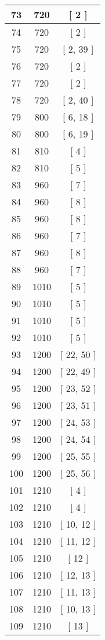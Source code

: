 \begin{center}
\begin{longtable}[H]{|| c c c ||}
73 & 720 & [ 2 ] \\ 
\hline
74 & 720 & [ 2 ] \\ 
\hline
75 & 720 & [ 2, 39 ] \\ 
\hline
76 & 720 & [ 2 ] \\ 
\hline
77 & 720 & [ 2 ] \\ 
\hline
78 & 720 & [ 2, 40 ] \\ 
\hline
79 & 800 & [ 6, 18 ] \\ 
\hline
80 & 800 & [ 6, 19 ] \\ 
\hline
81 & 810 & [ 4 ] \\ 
\hline
82 & 810 & [ 5 ] \\ 
\hline
83 & 960 & [ 7 ] \\ 
\hline
84 & 960 & [ 8 ] \\ 
\hline
85 & 960 & [ 8 ] \\ 
\hline
86 & 960 & [ 7 ] \\ 
\hline
87 & 960 & [ 8 ] \\ 
\hline
88 & 960 & [ 7 ] \\ 
\hline
89 & 1010 & [ 5 ] \\ 
\hline
90 & 1010 & [ 5 ] \\ 
\hline
91 & 1010 & [ 5 ] \\ 
\hline
92 & 1010 & [ 5 ] \\ 
\hline
93 & 1200 & [ 22, 50 ] \\ 
\hline
94 & 1200 & [ 22, 49 ] \\ 
\hline
95 & 1200 & [ 23, 52 ] \\ 
\hline
96 & 1200 & [ 23, 51 ] \\ 
\hline
97 & 1200 & [ 24, 53 ] \\ 
\hline
98 & 1200 & [ 24, 54 ] \\ 
\hline
99 & 1200 & [ 25, 55 ] \\ 
\hline
100 & 1200 & [ 25, 56 ] \\ 
\hline
101 & 1210 & [ 4 ] \\ 
\hline
102 & 1210 & [ 4 ] \\ 
\hline
103 & 1210 & [ 10, 12 ] \\ 
\hline
104 & 1210 & [ 11, 12 ] \\ 
\hline
105 & 1210 & [ 12 ] \\ 
\hline
106 & 1210 & [ 12, 13 ] \\ 
\hline
107 & 1210 & [ 11, 13 ] \\ 
\hline
108 & 1210 & [ 10, 13 ] \\ 
\hline
109 & 1210 & [ 13 ] \\ 

\end{longtable}
\end{center}
